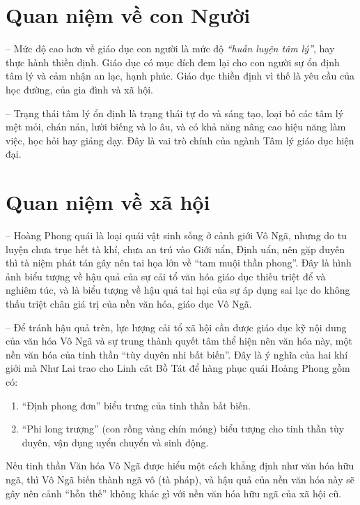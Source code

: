 \section{Quan niệm về con Người} %
\label{sec:20_21_22_con_nguoi}

-- Mức độ cao hơn về giáo dục con người là mức độ \emph{``huấn luyện tâm lý''}, hay thực hành thiền định. Giáo dục có mục đích đem lại cho con người sự ổn định tâm lý và cảm nhận an lạc, hạnh phúc. Giáo dục thiền định vì thế là yêu cầu của học đường, của gia đình và xã hội.

-- Trạng thái tâm lý ổn định là trạng thái tự do và sáng tạo, loại bỏ các tâm lý mệt mỏi, chán nản, lười biếng và lo âu, và có khả năng nâng cao hiệu năng làm việc, học hỏi hay giảng dạy. Đây là vai trò chính của ngành Tâm lý giáo dục hiện đại.

\section{Quan niệm về xã hội} %
\label{sec:20_21_22_xa_hoi}

-- Hoàng Phong quái là loại quái vật sinh sống ở cảnh giới Vô Ngã, nhưng do tu luyện chưa trục hết tà khí, chưa an trú vào Giới uẩn, Định uẩn, nên gặp duyên thì tà niệm phát tán gây nên tai họa lớn về ``tam muội thần phong''. Đây là hình ảnh biểu tượng về hậu quả của sự cải tổ văn hóa giáo dục thiếu triệt để và nghiêm túc, và là biểu tượng về hậu quả tai hại của sự áp dụng sai lạc do không thấu triệt chân giá trị của nền văn hóa, giáo dục Vô Ngã.

-- Để tránh hậu quả trên, lực lượng cải tổ xã hội cần được giáo dục kỹ nội dung của văn hóa Vô Ngã và sự trung thành quyết tâm thể hiện nên văn hóa này, một nền văn hóa của tinh thần ``tùy duyên nhi bất biến''. Đây là ý nghĩa của hai khí giới mà Như Lai trao cho Linh cát Bồ Tát để hàng phục quái Hoàng Phong gồm có:

\begin{enumerate}[label=\itshape\arabic*\upshape/]
   \item ``Định phong đơn'' biểu trưng của tinh thần bất biến.

   \item ``Phi long trượng'' (con rồng vàng chín móng) biểu tượng cho tinh thần tùy duyên, vận dụng uyển chuyển và sinh động.
\end{enumerate}

Nếu tinh thần Văn hóa Vô Ngã được hiểu một cách khẳng định như văn hóa hữu ngã, thì Vô Ngã biến thành ngã vô (tà pháp), và hậu quả của nền văn hóa này sẽ gây nên cảnh ``hỗn thế'' không khác gì với nền văn hóa hữu ngã của xã hội cũ.

